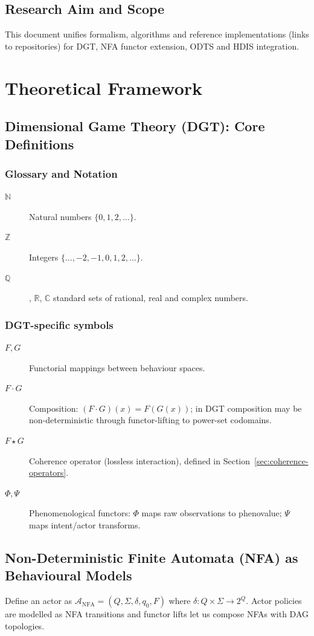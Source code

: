 \documentclass[12pt,a4paper]{article}
\begin{document}
\subsection{Research Aim and Scope}
This document unifies formalism, algorithms and reference implementations
(links to repositories) for DGT, NFA functor extension, ODTS and HDIS
integration.

\section{Theoretical Framework}
\subsection{Dimensional Game Theory (DGT): Core Definitions}
\subsubsection*{Glossary and Notation}
\begin{description}
  \item[$\mathbb{N}$] Natural numbers $\{0,1,2,\dots\}$.
  \item[$\mathbb{Z}$] Integers $\{\dots,-2,-1,0,1,2,\dots\}$.
  \item[$\mathbb{Q}$], $\mathbb{R}$, $\mathbb{C}$ standard sets of rational,
  real and complex numbers.
\end{description}

\subsubsection*{DGT-specific symbols}
\begin{description}
  \item[$F,G$] Functorial mappings between behaviour spaces.
  \item[$F\cdot G$] Composition: $(F\cdot G)(x)=F(G(x))$; in DGT composition may
    be non-deterministic through functor-lifting to power-set codomains.
  \item[$F\star G$] Coherence operator (lossless interaction), defined in
    Section~\ref{sec:coherence-operators}.
  \item[$\Phi,\Psi$] Phenomenological functors: $\Phi$ maps raw observations to
    phenovalue; $\Psi$ maps intent/actor transforms.
\end{description}

\subsection{Non-Deterministic Finite Automata (NFA) as Behavioural Models}
Define an actor as $\mathcal{A}_{\mathrm{NFA}}=(Q,\Sigma,\delta,q_0,F)$ where
$\delta:Q\times\Sigma\to 2^Q$. Actor policies are modelled as NFA transitions
and functor lifts let us compose NFAs with DAG topologies.
\end{document}
